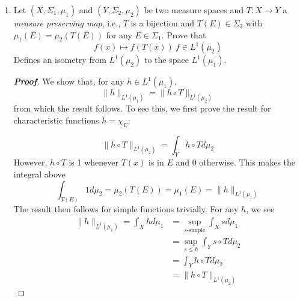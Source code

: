 \documentclass[12pt,leqno]{book}
\theoremstyle{definition}
\newenvironment{Proof}{\begin{proof}[\textnormal{\textbf{Proof}}]}{\end{proof}}
\begin{document}
\begin{enumerate}
\begin{Proof}
\end{Proof}

 \item Let $(X,\Sigma_1,\mu_1)$ and $(Y,\Sigma_2,\mu_2)$ be two measure spaces and $T:X\to Y$ a \textit{measure preserving map}, i.e., $T$ is a bijection and $T(E)\in\Sigma_2$ with $\mu_1(E)=\mu_2(T(E))$ for any $E\in\Sigma_1$. Prove that \[f(x)\mapsto f(T(x))\:f\in L^1(\mu_2)\] Defines an isometry from $L^1(\mu_2)$ to the space $L^1(\mu_1)$.

\begin{Proof}
 We show that, for any $h\in L^1(\mu_1)$, \[\|h\|_{L^1(\mu_1)}=\|h\circ T\|_{L^1(\mu_2)}\] from which the result follows. To see this, we first prove the result for characteristic functions $h=\chi_E$:

\[\|h\circ T\|_{L^1(\mu_2)}=\int_Yh\circ Td\mu_2\] However, $h\circ T$ is 1 whenever $T(x)$ is in $E$ and 0 otherwise. This makes the integral above \[\int_{T(E)}1d\mu_2=\mu_2(T(E))=\mu_1(E)=\|h\|_{L^1(\mu_1)}\] The result then follows for simple functions trivially. For any $h$, we see \begin{align*}\|h\|_{L^1(\mu_1)}=\int_Xhd\mu_1&=\sup_{s\text{-simple}}\int_Xsd\mu_1\\&=\sup_{s\leq h}\int_Ys\circ Td\mu_2\\&=\int_Yh\circ Td\mu_2\\&=\|h\circ T\|_{L^1(\mu_2)}\end{align*}
\end{Proof}

\end{enumerate}
\end{document}
